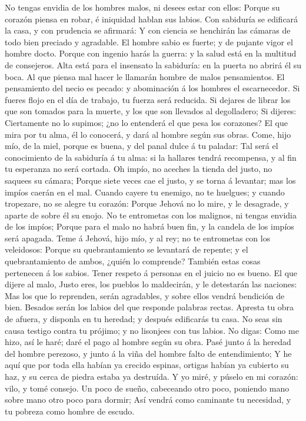  No tengas envidia de los hombres malos, ni desees estar con
ellos:  Porque su corazón piensa en robar, é iniquidad
hablan sus labios.  Con sabiduría se edificará la casa, y
con prudencia se afirmará:  Y con ciencia se henchirán las
cámaras de todo bien preciado y agradable.  El hombre sabio
es fuerte; y de pujante vigor el hombre docto.  Porque con
ingenio harás la guerra: y la salud está en la multitud de consejeros.
 Alta está para el insensato la sabiduría: en la puerta no
abrirá él su boca.  Al que piensa mal hacer le llamarán
hombre de malos pensamientos.  El pensamiento del necio es
pecado: y abominación á los hombres el escarnecedor.  Si
fueres flojo en el día de trabajo, tu fuerza será reducida.
 Si dejares de librar los que son tomados para la muerte, y
los que son llevados al degolladero;  Si dijeres:
Ciertamente no lo supimos; ¿no lo entenderá el que pesa los corazones?
El que mira por tu alma, él lo conocerá, y dará al hombre según sus
obras.  Come, hijo mío, de la miel, porque es buena, y del
panal dulce á tu paladar:  Tal será el conocimiento de la
sabiduría á tu alma: si la hallares tendrá recompensa, y al fin tu
esperanza no será cortada.  Oh impío, no aceches la tienda
del justo, no saquees su cámara;  Porque siete veces cae el
justo, y se torna á levantar; mas los impíos caerán en el mal.
 Cuando cayere tu enemigo, no te huelgues; y cuando
tropezare, no se alegre tu corazón:  Porque Jehová no lo
mire, y le desagrade, y aparte de sobre él su enojo.  No te
entrometas con los malignos, ni tengas envidia de los impíos;
 Porque para el malo no habrá buen fin, y la candela de los
impíos será apagada.  Teme á Jehová, hijo mío, y al rey; no
te entrometas con los veleidosos:  Porque su
quebrantamiento se levantará de repente; y el quebrantamiento de ambos,
¿quién lo comprende?  También estas cosas pertenecen á los
sabios. Tener respeto á personas en el juicio no es bueno. 
El que dijere al malo, Justo eres, los pueblos lo maldecirán, y le
detestarán las naciones:  Mas los que lo reprenden, serán
agradables, y sobre ellos vendrá bendición de bien. 
Besados serán los labios del que responde palabras rectas. 
Apresta tu obra de afuera, y disponla en tu heredad; y después
edificarás tu casa.  No seas sin causa testigo contra tu
prójimo; y no lisonjees con tus labios.  No digas: Como me
hizo, así le haré; daré el pago al hombre según su obra. 
Pasé junto á la heredad del hombre perezoso, y junto á la viña del
hombre falto de entendimiento;  Y he aquí que por toda ella
habían ya crecido espinas, ortigas habían ya cubierto su haz, y su cerca
de piedra estaba ya destruída.  Y yo miré, y púselo en mi
corazón: vilo, y tomé consejo.  Un poco de sueño,
cabeceando otro poco, poniendo mano sobre mano otro poco para dormir;
 Así vendrá como caminante tu necesidad, y tu pobreza como
hombre de escudo.

